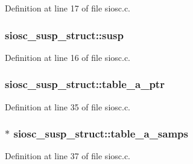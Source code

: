 Definition at line 17 of file siosc.\+c.

\subsubsection[{\texorpdfstring{susp}{susp}}]{ siosc\+\_\+susp\+\_\+struct\+::susp}\hypertarget{structsiosc__susp__struct_af41c663308416a3e1760fe7f946e8007}{}\label{structsiosc__susp__struct_af41c663308416a3e1760fe7f946e8007}


Definition at line 16 of file siosc.\+c.

\subsubsection[{\texorpdfstring{table\+\_\+a\+\_\+ptr}{table_a_ptr}}]{ siosc\+\_\+susp\+\_\+struct\+::table\+\_\+a\+\_\+ptr}\hypertarget{structsiosc__susp__struct_ac80d8496c1aa029b810fbbf3188a4bfe}{}\label{structsiosc__susp__struct_ac80d8496c1aa029b810fbbf3188a4bfe}


Definition at line 35 of file siosc.\+c.

\subsubsection[{\texorpdfstring{table\+\_\+a\+\_\+samps}{table_a_samps}}]{$\ast$ siosc\+\_\+susp\+\_\+struct\+::table\+\_\+a\+\_\+samps}\hypertarget{structsiosc__susp__struct_afdfd7ce5e832efc4ff2f4c957b5a78ed}{}\label{structsiosc__susp__struct_afdfd7ce5e832efc4ff2f4c957b5a78ed}


Definition at line 37 of file siosc.\+c.

